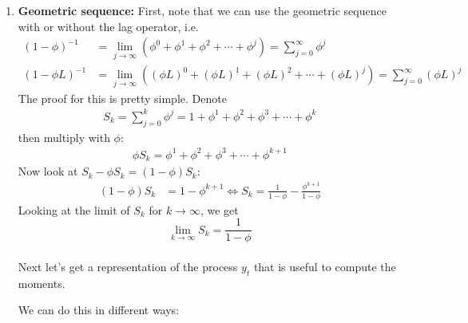 \begin{enumerate}

\item
\textbf{Geometric sequence:}
First, note that we can use the geometric sequence with or without the lag operator, i.e.\
\begin{align*}
{(1-\phi)}^{-1} &= \lim\limits_{j\rightarrow \infty}(\phi^0 + \phi^1 + \phi^2 + \cdots + \phi^j) = \sum_{j=0}^\infty \phi^j
\\
{(1-\phi L)}^{-1} &= \lim\limits_{j\rightarrow \infty}({(\phi L)}^0 + {(\phi L)}^1 + {(\phi L)}^2 + \cdots + {(\phi L)}^j) = \sum_{j=0}^\infty {(\phi L)}^j
\end{align*}
The proof for this is pretty simple. Denote
\begin{align*}
S_{k} =	\sum_{j=0}^{k} \phi^j =	1 + \phi^1 + \phi^2 + \phi^3 + \cdots + \phi^k
\end{align*}
then multiply with \(\phi \):
\begin{align*}
\phi S_k = \phi^1 + \phi^2 + \phi^3 + \cdots + \phi^{k+1}
\end{align*}
Now look at \(S_k - \phi S_k = (1 - \phi) S_{k}\):
\begin{align*}
(1-\phi) S_{k} &= 1 - \phi^{k+1}
\Leftrightarrow
S_{k}	= \frac{1}{1 - \phi} - \frac{\phi^{k+1}}{1-\phi}
\end{align*} 
Looking at the limit of \(S_{k}\) for \(k \to \infty \), we get
\[\lim\limits_{k \to \infty} S_{k} = \frac{1}{1 - \phi}\]
\\
Next let's get a representation of the process \(y_t\) that is useful to compute the moments.

We can do this in different ways:
\begin{itemize}


\end{itemize}
\end{enumerate}
